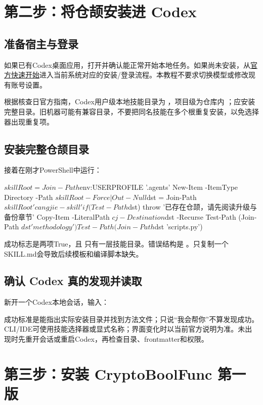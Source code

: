 \def\HostName{Codex}


\section{第二步：将仓颉安装进 Codex}
\subsection{准备宿主与登录}
如果已有Codex桌面应用，打开并确认能正常开始本地任务。如果尚未安装，从\href{https://developers.openai.com/codex/quickstart}{官方快速开始}进入当前系统对应的安装/登录流程\cite{codexquick}。本教程不要求切换模型或修改现有账号设置。

根据核查日官方指南，Codex用户级本地技能目录为 ，项目级为仓库内 ；应安装完整目录\cite{codexskills}。旧机器可能有兼容目录，不要把同名技能在多个根重复安装，以免选择器出现重复项。

\subsection{安装完整仓颉目录}
接着在刚才PowerShell中运行：
\begin{code}
$skillRoot = Join-Path $env:USERPROFILE '.agents\skills'
New-Item -ItemType Directory -Path $skillRoot -Force | Out-Null
$dst = Join-Path $skillRoot 'cangjie-skill'
if (Test-Path $dst) { throw '已存在仓颉，请先阅读升级与备份章节' }
Copy-Item -LiteralPath $cj -Destination $dst -Recurse
Test-Path (Join-Path $dst 'methodology')
Test-Path (Join-Path $dst 'scripts\cangjie.py')
\end{code}
成功标志是两项True，且  只有一层技能目录。错误结构是 。只复制一个SKILL.md会导致后续模板和编译脚本缺失。

\subsection{确认 Codex 真的发现并读取}
新开一个Codex本地会话，输入：
成功标准是能指出实际安装目录并找到方法文件；只说“我会帮你”不算发现成功。CLI/IDE可使用技能选择器或显式名称；界面变化时以当前官方说明为准。未出现时先重开会话或重启Codex，再检查目录、frontmatter和权限。

\section{第三步：安装 CryptoBoolFunc 第一版}
